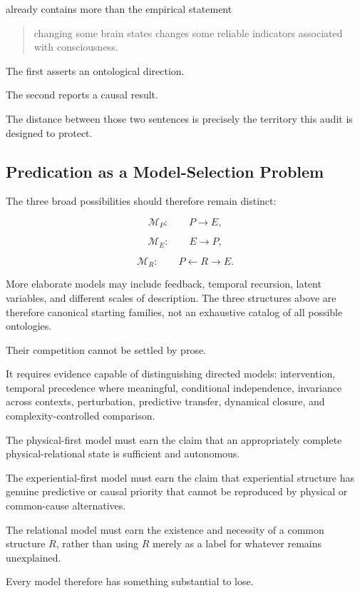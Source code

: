 already contains more than the empirical statement

\begin{quote}
changing some brain states changes some reliable indicators associated with consciousness.
\end{quote}

The first asserts an ontological direction.

The second reports a causal result.

The distance between those two sentences is precisely the territory this audit is designed to protect.

\subsection{Predication as a Model-Selection Problem}

The three broad possibilities should therefore remain distinct:

\[
\mathcal M_P:
\qquad
P\rightarrow E,
\]

\[
\mathcal M_E:
\qquad
E\rightarrow P,
\]

\[
\mathcal M_R:
\qquad
P\leftarrow R\rightarrow E.
\]

More elaborate models may include feedback, temporal recursion, latent variables, and different scales of description. The three structures above are therefore canonical starting families, not an exhaustive catalog of all possible ontologies.

Their competition cannot be settled by prose.

It requires evidence capable of distinguishing directed models: intervention, temporal precedence where meaningful, conditional independence, invariance across contexts, perturbation, predictive transfer, dynamical closure, and complexity-controlled comparison.

The physical-first model must earn the claim that an appropriately complete physical-relational state is sufficient and autonomous.

The experiential-first model must earn the claim that experiential structure has genuine predictive or causal priority that cannot be reproduced by physical or common-cause alternatives.

The relational model must earn the existence and necessity of a common structure $R$, rather than using $R$ merely as a label for whatever remains unexplained.

Every model therefore has something substantial to lose.

